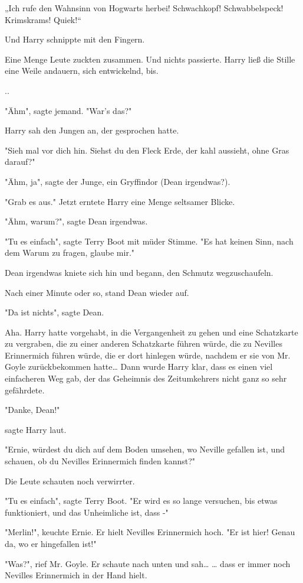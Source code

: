 {„Ich rufe den Wahnsinn von Hogwarts herbei! Schwachkopf! Schwabbelspeck! Krimskrams! Quiek!“

Und Harry schnippte mit den Fingern.

Eine Menge Leute zuckten zusammen. Und nichts passierte. Harry ließ die Stille eine Weile andauern, sich entwickelnd, bis.

..

"Ähm", sagte jemand. "War's das?"

Harry sah den Jungen an, der gesprochen hatte.

"Sieh mal vor dich hin. Siehst du den Fleck Erde, der kahl aussieht, ohne Gras darauf?"

"Ähm, ja", sagte der Junge, ein Gryffindor (Dean irgendwas?).

"Grab es aus." Jetzt erntete Harry eine Menge seltsamer Blicke.

"Ähm, warum?", sagte Dean irgendwas.

"Tu es einfach", sagte Terry Boot mit müder Stimme. "Es hat keinen Sinn, nach dem Warum zu fragen, glaube mir."

Dean irgendwas kniete sich hin und begann, den Schmutz wegzuschaufeln.

Nach einer Minute oder so, stand Dean wieder auf.

"Da ist nichts", sagte Dean.

Aha. Harry hatte vorgehabt, in die Vergangenheit zu gehen und eine Schatzkarte zu vergraben, die zu einer anderen Schatzkarte führen würde, die zu Nevilles Erinnermich führen würde, die er dort hinlegen würde, nachdem er sie von Mr. Goyle zurückbekommen hatte… Dann wurde Harry klar, dass es einen viel einfacheren Weg gab, der das Geheimnis des Zeitumkehrers nicht ganz so sehr gefährdete.

"Danke, Dean!"

sagte Harry laut.

"Ernie, würdest du dich auf dem Boden umsehen, wo Neville gefallen ist, und schauen, ob du Nevilles Erinnermich finden kannst?"

Die Leute schauten noch verwirrter.

"Tu es einfach", sagte Terry Boot. "Er wird es so lange versuchen, bis etwas funktioniert, und das Unheimliche ist, dass -"

"Merlin!", keuchte Ernie. Er hielt Nevilles Erinnermich hoch. "Er ist hier! Genau da, wo er hingefallen ist!"

"Was?", rief Mr. Goyle. Er schaute nach unten und sah… … dass er immer noch Nevilles Erinnermich in der Hand hielt.

}
